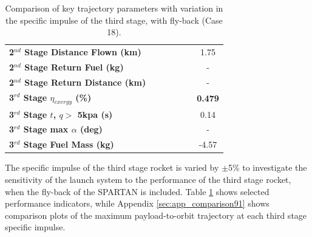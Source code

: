 \begin{table}[ht]
\begin{tabular}{l c c c c c c}
		\textbf{2$^{nd}$ Stage Distance Flown (km)}
		& \SecondDistISPThreeNinety
		& \SecondDistISPThreeNinetyFive
		& \SecondDistISPThreeStandard
		& \SecondDistISPThreeOneHundredFive
		& \SecondDistISPThreeOneHundredTen
		&1.75
		\\
		\textbf{2$^{nd}$ Stage Return Fuel (kg)}
		& \returnFuelISPThreeNinety
		& \returnFuelISPThreeNinetyFive
		& \returnFuelISPThreeStandard
		& \returnFuelISPThreeOneHundredFive
		& \returnFuelISPThreeOneHundredTen
		& -
		\\
		\textbf{2$^{nd}$ Stage Return Distance (km)}
		& \returnDistISPThreeNinety
		& \returnDistISPThreeNinetyFive
		& \returnDistISPThreeStandard
		& \returnDistISPThreeOneHundredFive
		& \returnDistISPThreeOneHundredTen
		& -
		\\
		\hline 
		\textbf{3$^{rd}$ Stage $\eta_{exergy}$ (\%)}
		& \textbf{\thirddExergyEffISPThreeNinety}
		& \textbf{\thirddExergyEffISPThreeNinetyFive}
		& \textbf{\thirddExergyEffISPThreeStandard}
		& \textbf{\thirddExergyEffISPThreeOneHundredFive}
		& \textbf{\thirddExergyEffISPThreeOneHundredTen}
		& \textbf{0.479}
		\\
		\textbf{3$^{rd}$ Stage $t$, $q >$ 5kpa (s)}
		& \thirdqOverFiveISPThreeNinety
		& \thirdqOverFiveISPThreeNinetyFive
		& \thirdqOverFiveISPThreeStandard
		& \thirdqOverFiveISPThreeOneHundredFive
		& \thirdqOverFiveISPThreeOneHundredTen
		&0.14
		\\
		\textbf{3$^{rd}$ Stage max $\alpha$ (deg)}
		& \thirdmaxAoAISPThreeNinety
		& \thirdmaxAoAISPThreeNinetyFive
		& \thirdmaxAoAISPThreeStandard
		& \thirdmaxAoAISPThreeOneHundredFive
		& \thirdmaxAoAISPThreeOneHundredTen
		& -
		\\
		\textbf{3$^{rd}$ Stage Fuel Mass (kg)}
		& \thirdmFuelISPThreeNinety
		& \thirdmFuelISPThreeNinetyFive
		& \thirdmFuelISPThreeStandard
		& \thirdmFuelISPThreeOneHundredFive
		& \thirdmFuelISPThreeOneHundredTen
		&-4.57
		\\
		\hline 
	\end{tabular} 
	\caption{Comparison of key trajectory parameters with variation in the specific impulse of the third stage, with fly-back (Case 18).}
	\label{tab:isp3}
\end{table}

The specific impulse of the third stage rocket is varied by $\pm$5\% to investigate the sensitivity of the launch system to the performance of the third stage rocket, when the fly-back of the SPARTAN is included. 
Table \ref{tab:isp3} shows selected performance indicators, while Appendix \ref{sec:app_comparison91} shows comparison plots of the maximum payload-to-orbit trajectory at each third stage specific impulse. 

